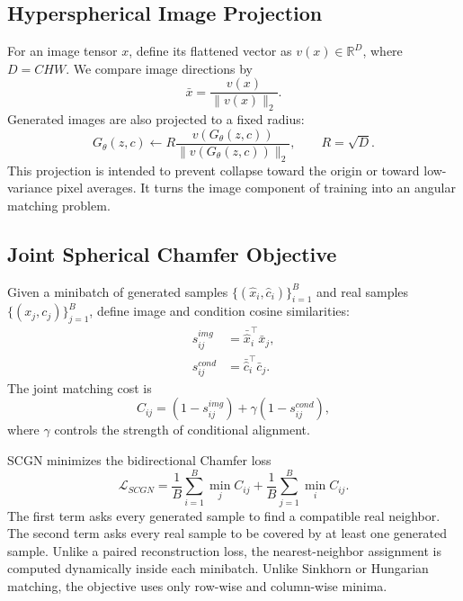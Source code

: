 \documentclass[11pt]{article}
\begin{document}
\subsection{Hyperspherical Image Projection}
For an image tensor $x$, define its flattened vector as
$v(x)\in\mathbb{R}^{D}$, where $D=CHW$. We compare image directions by
\begin{equation}
    \bar{x} = \frac{v(x)}{\|v(x)\|_2}.
\end{equation}
Generated images are also projected to a fixed radius:
\begin{equation}
    G_\theta(z,c) \leftarrow
    R \frac{v(G_\theta(z,c))}{\|v(G_\theta(z,c))\|_2},
    \qquad R=\sqrt{D}.
\end{equation}
This projection is intended to prevent collapse toward the origin or toward
low-variance pixel averages. It turns the image component of training into an
angular matching problem.

\subsection{Joint Spherical Chamfer Objective}
Given a minibatch of generated samples
$\{(\hat{x}_i,\hat{c}_i)\}_{i=1}^{B}$ and real samples
$\{(x_j,c_j)\}_{j=1}^{B}$, define image and condition cosine similarities:
\begin{align}
    s^{img}_{ij} &= \bar{\hat{x}}_i^\top \bar{x}_j,\\
    s^{cond}_{ij} &= \bar{\hat{c}}_i^\top \bar{c}_j.
\end{align}
The joint matching cost is
\begin{equation}
    C_{ij} =
    (1 - s^{img}_{ij}) + \gamma(1 - s^{cond}_{ij}),
\end{equation}
where $\gamma$ controls the strength of conditional alignment.

SCGN minimizes the bidirectional Chamfer loss
\begin{equation}
    \mathcal{L}_{SCGN}
    =
    \frac{1}{B}\sum_{i=1}^{B}\min_j C_{ij}
    +
    \frac{1}{B}\sum_{j=1}^{B}\min_i C_{ij}.
\end{equation}
The first term asks every generated sample to find a compatible real neighbor.
The second term asks every real sample to be covered by at least one generated
sample. Unlike a paired reconstruction loss, the nearest-neighbor assignment is
computed dynamically inside each minibatch. Unlike Sinkhorn or Hungarian
matching, the objective uses only row-wise and column-wise minima.
\end{document}
